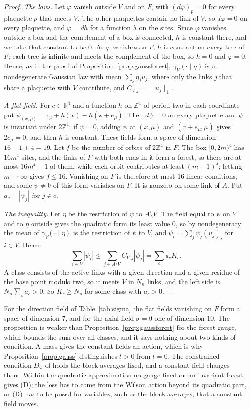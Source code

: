 \documentclass[aps,prd,twocolumn,superscriptaddress,nofootinbib,longbibliography,floatfix,amsmath,amssymb,10pt]{revtex4-2}
\theoremstyle{definition}
\theoremstyle{remark}
\newcommand{\R}{\mathbb{R}}
\newcommand{\Z}{\mathbb{Z}}
\begin{document}
\begin{proof}
\emph{The laws.} Let $\varphi$ vanish outside $V$ and on $F$, with
$(d\varphi)_p=0$ for every plaquette $p$ that meets $V$. The other plaquettes
contain no link of $V$, so $d\varphi=0$ on every plaquette, and
$\varphi=dh$ for a function $h$ on the sites. Since $\varphi$ vanishes
outside a box and the complement of a box is connected, $h$ is constant
there, and we take that constant to be $0$. As $\varphi$ vanishes on $F$, $h$
is constant on every tree of $F$; each tree is infinite and meets the
complement of the box, so $h=0$ and $\varphi=0$. Hence, as in the proof of
Proposition~\ref{prop:gaussforest}, $\gamma_V(\cdot\mid\eta)$ is a
nondegenerate Gaussian law with mean $\sum_j\eta_ju_j$, where only the links
$j$ that share a plaquette with $V$ contribute, and $C_{V,j}=\|u_j\|_1$.

\emph{A flat field.} For $c\in\R^4$ and a function $h$ on $\Z^4$ of period
two in each coordinate put $\psi_{(x,\mu)}=c_\mu+h(x)-h(x+e_\mu)$. Then
$d\psi=0$ on every plaquette and $\psi$ is invariant under $2\Z^4$; if
$\psi=0$, adding $\psi$ at $(x,\mu)$ and $(x+e_\mu,\mu)$ gives $2c_\mu=0$,
and then $h$ is constant. These fields form a space of dimension
$16-1+4=19$. Let $f$ be the number of orbits of $2\Z^4$ in $F$. The box
$[0,2m)^4$ has $16m^4$ sites, and the links of $F$ with both ends in it form
a forest, so there are at most $16m^4-1$ of them, while each orbit
contributes at least $(m-1)^4$; letting $m\to\infty$ gives $f\le16$. Vanishing
on $F$ is therefore at most $16$ linear conditions, and some $\psi\ne0$ of
this form vanishes on $F$. It is nonzero on some link of $A$. Put
$a_c=|\psi_j|$ for $j\in c$.

\emph{The inequality.} Let $\eta$ be the restriction of $\psi$ to
$A\setminus V$. The field equal to $\psi$ on $V$ and to $\eta$ outside gives
the quadratic form its least value $0$, so by nondegeneracy the mean of
$\gamma_V(\cdot\mid\eta)$ is the restriction of $\psi$ to $V$, and
$\psi_i=\sum_j\psi_j(u_j)_i$ for $i\in V$. Hence
\[
\sum_{i\in V}|\psi_i|\le\sum_{j\in A\setminus V}C_{V,j}|\psi_j|=\sum_ca_cK_c .
\]
A class consists of the active links with a given direction and a given
residue of the base point modulo two, so it meets $V$ in $N_n$ links, and
the left side is $N_n\sum_ca_c>0$. So $K_c\ge N_n$ for some class with
$a_c>0$.
\end{proof}

For the direction field of Table~\ref{tab:sigma} the flat fields vanishing
on $F$ form a space of dimension $7$, and for the axial field $\sigma=0$ one
of dimension $10$. The proposition is weaker than
Proposition~\ref{prop:gaussforest} for the forest gauge, which bounds the
sum over all classes, and it says nothing about two kinds of condition. A
mass gives the constant fields an action, which is why
Proposition~\ref{prop:gauss} distinguishes $t>0$ from $t=0$. The constrained
condition $D_{\rm c}$ of \cite[Theorem~334]{BBLR26} holds the block
averages fixed, and a constant field changes them. Within the quadratic
approximation no gauge fixed on an invariant forest gives (D); the loss has
to come from the Wilson action beyond its quadratic part, or (D) has to be
posed for variables, such as the block averages, that a constant field
moves.
\end{document}
